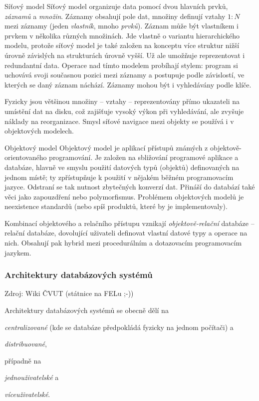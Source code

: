 \begin{obecne}{Síťový model}
Síťový model organizuje data pomocí dvou hlavních prvků, \emph{záznamů} a \emph{množin}. Záznamy obsahují pole dat, množiny definují vztahy $1:N$ mezi záznamy (jeden \emph{vlastník}, mnoho \emph{prvků}). Záznam může být vlastníkem i prvkem v několika různých množinách. Jde vlastně o variantu hierarchického modelu, protože síťový model je také založen na konceptu více struktur nižší úrovně závislých na strukturách úrovně vyšší. Už ale umožňuje reprezentovat i redundantní data. Operace nad tímto modelem probíhají  stylem: program si uchovává svoji současnou pozici mezi záznamy a postupuje podle závislostí, ve kterých se daný záznam náchází. Záznamy mohou být i vyhledávány podle klíče. 

Fyzicky jsou většinou množiny -- vztahy -- reprezentovány přímo ukazateli na umístění dat na disku, což zajišťuje vysoký výkon při vyhledávání, ale zvyšuje náklady na reorganizace. Smysl síťové navigace mezi objekty se používá i v objektových modelech.
\end{obecne}

\begin{obecne}{Objektový model}
Objektový model je aplikací přístupů známých z objektově-orientovaného programování. Je založen na sbližování programové aplikace a databáze, hlavně ve smyslu použití datových typů (objektů) definovaných na jednom místě; ty zpřístupňuje k použití v nějakém běžném programovacím jazyce. Odstraní se tak nutnost zbytečných konverzí dat. Přináší do databází také věci jako zapouzdření nebo polymorfismus. Problémem objektových modelů je neexistence standardů (nebo spíš produktů, které by je implementovaly).

Kombinací objektového a relačního přístupu vznikají \emph{objektově-relační} databáze -- relační databáze, dovolující uživateli definovat vlastní datové typy a operace na nich. Obsahují pak hybrid mezi procedurálním a dotazovacím programovacím jazykem.

\end{obecne}


\subsubsection*{Architektury databázových systémů}

Zdroj: Wiki ČVUT (státnice na FELu ;-))
\bigskip

Architektury databázových systémů se obecně dělí na 
\begin{pitemize}
    \item \emph{centralizované} (kde se databáze předpokládá fyzicky na jednom počítači) a
    \item \emph{distribuované},
\end{pitemize}
případně na
\begin{pitemize}
    \item \emph{jednouživatelské} a
    \item \emph{víceuživatelské}.
\end{pitemize}

